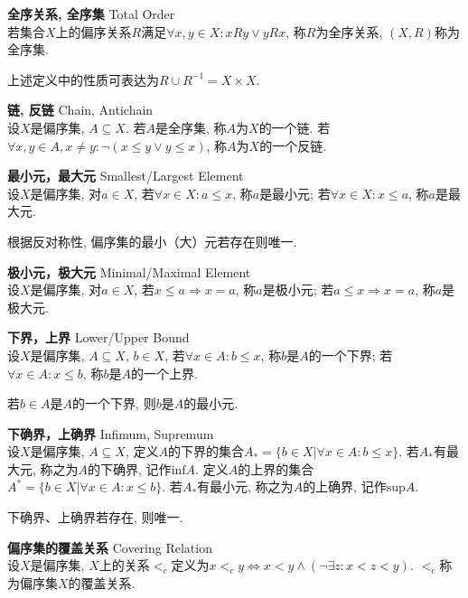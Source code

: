 \begin{dfn} \textbf{全序关系, 全序集} Total Order\\
若集合$X$上的偏序关系$R$满足$\forall x,y\in X: xRy \lor yRx$, 称$R$为全序关系, $(X,R)$称为全序集. 
\end{dfn}
上述定义中的性质可表达为$R\cup R^{-1}=X\times X$.

\begin{dfn} \textbf{链, 反链} Chain, Antichain\\
设$X$是偏序集, $A\subseteq X$. 若$A$是全序集, 称$A$为$X$的一个链. 若$\forall x,y\in A, x\neq y: \lnot (x\le y \lor y\le x)$, 称$A$为$X$的一个反链. 
\end{dfn}


\begin{dfn} \textbf{最小元，最大元} Smallest/Largest Element\\
设$X$是偏序集, 对$a\in X$, 若$\forall x\in X: a\le x$, 称$a$是最小元; 若$\forall x\in X: x\le a$, 称$a$是最大元. 
\end{dfn}
根据反对称性, 偏序集的最小（大）元若存在则唯一. 

\begin{dfn} \textbf{极小元，极大元} Minimal/Maximal Element\\
设$X$是偏序集, 对$a\in X$, 若$x\le a\Rightarrow x=a$, 称$a$是极小元; 若$a\le x\Rightarrow x=a$, 称$a$是极大元. 
\end{dfn}

\begin{dfn} \textbf{下界，上界} Lower/Upper Bound\\
设$X$是偏序集, $A\subseteq X$, $b\in X$, 若$\forall x\in A: b\le x$, 称$b$是$A$的一个下界; 若$\forall x\in A: x\le b$, 称$b$是$A$的一个上界. 
\end{dfn}
若$b\in A$是$A$的一个下界, 则$b$是$A$的最小元.

\begin{dfn} \textbf{下确界，上确界} Infimum, Supremum\\
设$X$是偏序集, $A\subseteq X$, 定义$A$的下界的集合$A_*=\{b\in X\vert \forall x\in A: b\le x\}$. 若$A_*$有最大元, 称之为$A$的下确界, 记作$\text{inf} A$. 定义$A$的上界的集合$A^*=\{b\in X\vert \forall x\in A: x\le b\}$. 若$A_*$有最小元, 称之为$A$的上确界, 记作$\text{sup} A$. 
\end{dfn}
\par 下确界、上确界若存在, 则唯一. 

\begin{dfn} \textbf{偏序集的覆盖关系} Covering Relation\\
设$X$是偏序集, $X$上的关系$<_c$定义为$x<_c y \iff x<y \land (\lnot \exists z: x<z<y)$. $<_c$称为偏序集$X$的覆盖关系. 
\end{dfn}

